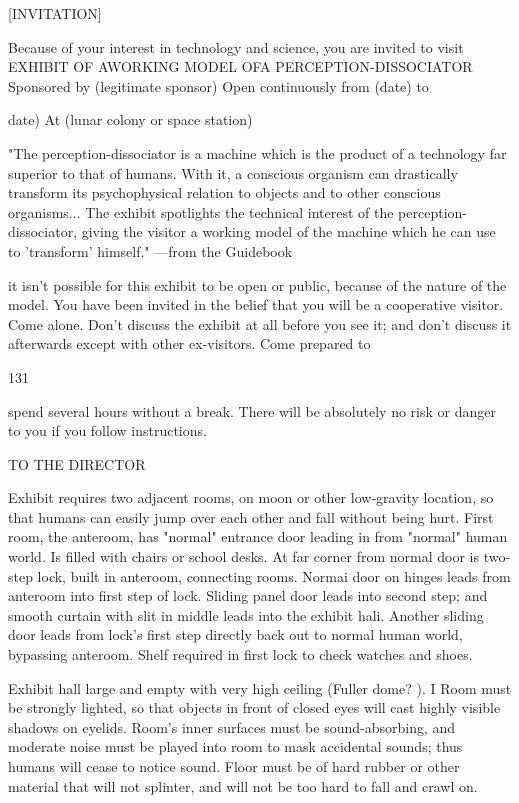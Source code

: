 \documentclass[10pt,twoside]{memoir}
\begin{document}
\begin{enumerate}
{{{{{{{{{{{{{{{{{[INVITATION] 


Because of your interest in technology and science, you are invited to visit 
EXHIBIT OF AWORKING MODEL OFA 
PERCEPTION-DISSOCIATOR 
Sponsored by (legitimate sponsor) Open continuously from (date) 
to {date) At (lunar colony or space station) 

"The perception-dissociator is a machine which is the product of a 
technology far superior to that of humans. With it, a conscious organism can 
drastically transform its psychophysical relation to objects and to other 
conscious organisms... The exhibit spotlights the technical interest of the 
perception-dissociator, giving the visitor a working model of the machine 
which he can use to 'transform' himself." —from the Guidebook 


it isn't possible for this exhibit to be open or public, because of the nature of 
the model. You have been invited in the belief that you will be a cooperative 
visitor. Come alone. Don't discuss the exhibit at all before you see it; and 
don't discuss it afterwards except with other ex-visitors. Come prepared to 


131 


spend several hours without a break. There will be absolutely no risk or 
danger to you if you follow instructions. 


TO THE DIRECTOR 


Exhibit requires two adjacent rooms, on moon or other low-gravity 
location, so that humans can easily jump over each other and fall without 
being hurt. First room, the anteroom, has "normal" entrance door leading in 
from "normal" human world. Is filled with chairs or school desks. At far 
corner from normal door is two-step lock, built in anteroom, connecting 
rooms. Normai door on hinges leads from anteroom into first step of lock. 
Sliding panel door leads into second step; and smooth curtain with slit in 
middle leads into the exhibit hali. Another sliding door leads from lock's 
first step directly back out to normal human world, bypassing anteroom. 
Shelf required in first lock to check watches and shoes. 

Exhibit hall large and empty with very high ceiling (Fuller dome? ). I 
Room must be strongly lighted, so that objects in front of closed eyes will 
cast highly visible shadows on eyelids. Room's inner surfaces must be 
sound-absorbing, and moderate noise must be played into room to mask 
accidental sounds; thus humans will cease to notice sound. Floor must be of 
hard rubber or other material that will not splinter, and will not be too hard 
to fall and crawl on. 

}}}}}}}}}}}}}}}}}}
\end{enumerate}
\end{document}
